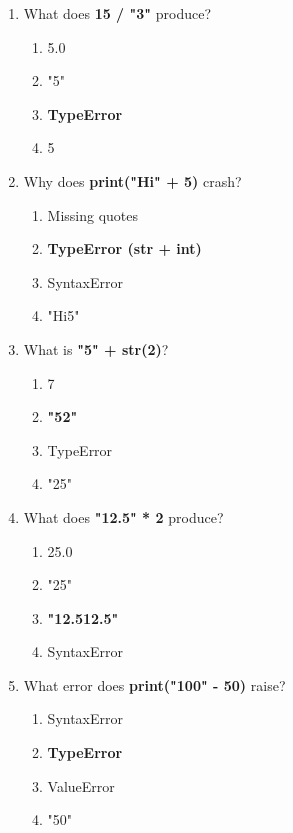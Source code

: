 \documentclass{article}
\begin{document}
\begin{multicols*}{4}
\begin{enumerate}
        \item What does \textbf{15 / "3"} produce?
        \begin{enumerate}[label=(\Alph*)]
            \item 5.0
            \item "5"
            \item \textbf{TypeError}
            \item 5
        \end{enumerate}

        \item Why does \textbf{print("Hi" + 5)} crash?
        \begin{enumerate}[label=(\Alph*)]
            \item Missing quotes
            \item \textbf{TypeError (str + int)}
            \item SyntaxError
            \item "Hi5"
        \end{enumerate}


        \item What is \textbf{"5" + str(2)}?
        \begin{enumerate}[label=(\Alph*)]
            \item 7
            \item \textbf{"52"}
            \item TypeError
            \item "25"
        \end{enumerate}

        \item What does \textbf{"12.5" * 2} produce?
        \begin{enumerate}[label=(\Alph*)]
            \item 25.0
            \item "25"
            \item \textbf{"12.512.5"}
            \item SyntaxError
        \end{enumerate}

        \item What error does \textbf{print("100" - 50)} raise?
        \begin{enumerate}[label=(\Alph*)]
            \item SyntaxError
            \item \textbf{TypeError}
            \item ValueError
            \item "50"
        \end{enumerate}


\end{enumerate}
\end{multicols*}
\end{document}
